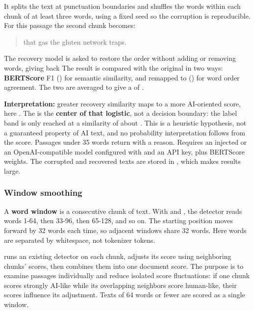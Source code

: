 It splits the text at punctuation boundaries and shuffles the words
within each chunk of at least three words, using a fixed seed so the
corruption is reproducible. For this passage the second chunk becomes:

\begin{quote}
that gas the gluten network traps.
\end{quote}

The recovery model is asked to restore the order without adding or
removing words, giving back
\texttt{} The result is
compared with the original in two ways: \textbf{BERTScore} F1
(\texttt{}) for semantic similarity, and
\texttt{} remapped to
\texttt{\seqsplit{[0, 1]}} (\texttt{}) for word order
agreement. The two are averaged to give a
\texttt{} of \texttt{}.

\textbf{Interpretation:} greater recovery similarity maps to a more
AI-oriented score, here
\texttt{}. The
\texttt{} is the \textbf{center of that logistic}, not a
decision boundary: the \texttt{} label band is only
reached at a similarity of about \texttt{}. This is a
heuristic hypothesis, not a guaranteed property of AI text, and no
probability interpretation follows from the score. Passages under 35
words return \texttt{} with a reason. Requires an
injected \texttt{} or an OpenAI-compatible model
configured with \texttt{} and an API key,
plus BERTScore weights. The corrupted and recovered texts are stored in
\texttt{}, which makes results large.

\subsubsection{Window
smoothing}\label{record-DETECTORS-md-window-smoothing}

A \textbf{word window} is a consecutive chunk of text. With
\texttt{} and
\texttt{}, the detector reads words 1-64, then
33-96, then 65-128, and so on. The starting position moves forward by 32
words each time, so adjacent windows share 32 words. Here words are
separated by whitespace, not tokenizer tokens.

\texttt{} runs an existing detector
on each chunk, adjusts its score using neighboring chunks' scores, then
combines them into one document score. The purpose is to examine
passages individually and reduce isolated score fluctuations: if one
chunk scores strongly AI-like while its overlapping neighbors score
human-like, their scores influence its adjustment. Texts of 64 words or
fewer are scored as a single window.

